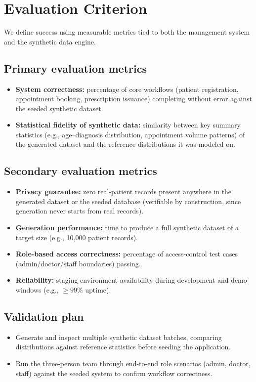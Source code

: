 \documentclass[11pt]{article}
\begin{document}
\section{Evaluation Criterion}
We define success using measurable metrics tied to both the management system and the synthetic data engine.

\subsection{Primary evaluation metrics}
\begin{itemize}
    \item \textbf{System correctness:} percentage of core workflows (patient registration, appointment booking, prescription issuance) completing without error against the seeded synthetic dataset.
    \item \textbf{Statistical fidelity of synthetic data:} similarity between key summary statistics (e.g., age--diagnosis distribution, appointment volume patterns) of the generated dataset and the reference distributions it was modeled on.
\end{itemize}

\subsection{Secondary evaluation metrics}
\begin{itemize}
    \item \textbf{Privacy guarantee:} zero real-patient records present anywhere in the generated dataset or the seeded database (verifiable by construction, since generation never starts from real records).
    \item \textbf{Generation performance:} time to produce a full synthetic dataset of a target size (e.g., 10,000 patient records).
    \item \textbf{Role-based access correctness:} percentage of access-control test cases (admin/doctor/staff boundaries) passing.
    \item \textbf{Reliability:} staging environment availability during development and demo windows (e.g., $\geq 99\%$ uptime).
\end{itemize}

\subsection{Validation plan}
\begin{itemize}
    \item Generate and inspect multiple synthetic dataset batches, comparing distributions against reference statistics before seeding the application.
    \item Run the three-person team through end-to-end role scenarios (admin, doctor, staff) against the seeded system to confirm workflow correctness.
\end{itemize}
\end{document}
